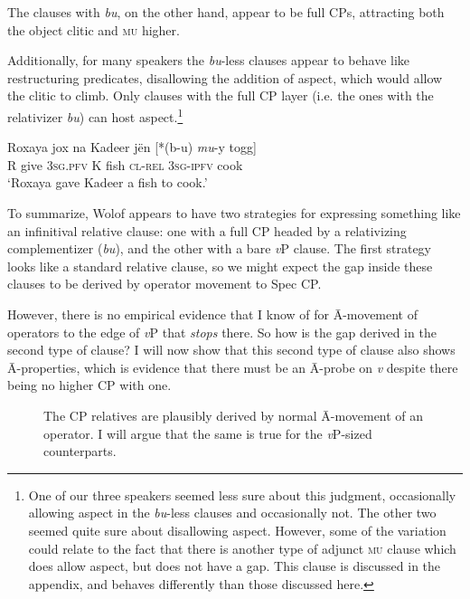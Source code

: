 \documentclass[output=paper]{langscibook}
\begin{document}
The clauses with \emph{bu}, on the other hand, appear to be full CPs, attracting both the object clitic and \textsc{mu} higher. 

Additionally, for many speakers the \emph{bu}-less clauses appear to behave like restructuring predicates, disallowing the addition of aspect, which would allow the clitic to climb. Only clauses with the full CP layer (i.e. the ones with the relativizer \emph{bu}) can host aspect.\footnote{One of our three speakers seemed less sure about this judgment, occasionally allowing aspect in the \emph{bu}-less clauses and occasionally not. The other two seemed quite sure about disallowing aspect. However, some of the variation could relate to the fact that there is another type of adjunct \textsc{mu} clause which does allow aspect, but does not have a gap. This clause is discussed in the appendix, and behaves differently than those discussed here.}

\begin{exe}
	\ex 
	\gll Roxaya jox na Kadeer j\"en [*(b-u) \emph{mu}-y togg] \\
	R give \textsc{3sg.pfv} K fish \textsc{cl-rel} \textsc{3sg-ipfv} cook \\
	\trans `Roxaya gave Kadeer a fish to cook.'
\end{exe}


To summarize, Wolof appears to have two strategies for expressing something like an infinitival relative clause: one with a full CP headed by a relativizing complementizer (\emph{bu}), and the other with a bare \textit{v}P clause. The first strategy looks like a standard relative clause, so we might expect the gap inside these clauses to be derived by operator movement to Spec CP. 

However, there is no empirical evidence that I know of for \={A}-movement of operators to the edge of \textit{v}P that \emph{stops} there. So how is the gap derived in the second type of clause? I will now show that this second type of clause also shows \={A}-properties, which is evidence that there must be an \={A}-probe on \textit{v} despite there being no higher CP with one. 

\begin{figure}
\caption{The CP relatives are plausibly derived by normal \={A}-movement of an operator. I will argue that the same is true for the \textit{v}P-sized counterparts.}
\end{figure}
\end{document}

